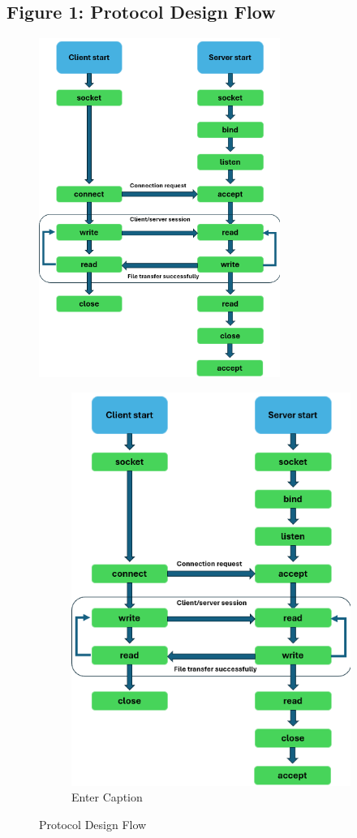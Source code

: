 \documentclass[a4paper,12pt]{article}
\begin{document}
\subsection{Figure 1: Protocol Design Flow}
\begin{figure}[ht!]
    \centering
    \includegraphics[width=0.7\textwidth]{"1.png"}
\begin{figure}
        \centering
        \includegraphics[width=0.5\linewidth]{1.png}
        \caption{Enter Caption}
        \label{fig:enter-label}
    \end{figure}
        \caption{Protocol Design Flow}
    \label{fig:protocol_design}
\end{figure}
\end{document}
